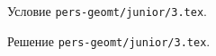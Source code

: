 \problem
Условие \texttt{pers-geomt/junior/3.tex}.

\solution Решение \texttt{pers-geomt/junior/3.tex}.
\endproblem
